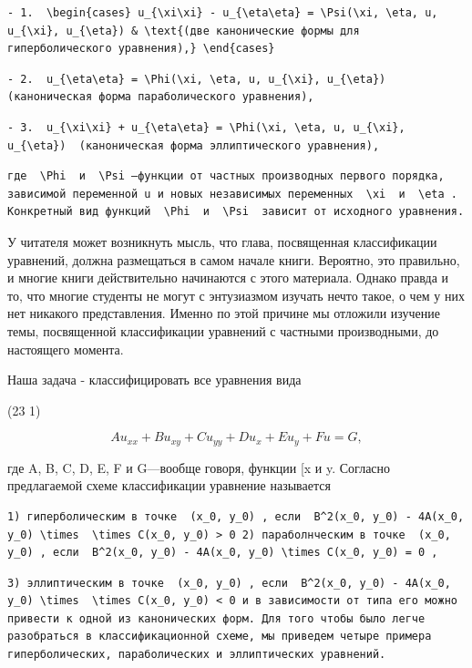\documentclass[
  ukrainian,
]{article}
\begin{document}
\begin{verbatim}
- 1.  \begin{cases} u_{\xi\xi} - u_{\eta\eta} = \Psi(\xi, \eta, u, u_{\xi}, u_{\eta}) & \text{(две канонические формы для гиперболического уравнения),} \end{cases}
\end{verbatim}

\begin{verbatim}
- 2.  u_{\eta\eta} = \Phi(\xi, \eta, u, u_{\xi}, u_{\eta})  (каноническая форма параболического уравнения),
\end{verbatim}

\begin{verbatim}
- 3.  u_{\xi\xi} + u_{\eta\eta} = \Phi(\xi, \eta, u, u_{\xi}, u_{\eta})  (каноническая форма эллиптического уравнения),
\end{verbatim}

\begin{verbatim}
где  \Phi  и  \Psi —функции от частных производных первого порядка, зависимой переменной u и новых независимых переменных  \xi  и  \eta . Конкретный вид функций  \Phi  и  \Psi  зависит от исходного уравнения.
\end{verbatim}

У читателя может возникнуть мысль, что глава, посвященная классификации
уравнений, должна размещаться в самом начале книги. Вероятно, это
правильно, и многие книги действительно начинаются с этого материала.
Однако правда и то, что многие студенты не могут с энтузиазмом изучать
нечто такое, о чем у них нет никакого представления. Именно по этой
причине мы отложили изучение темы, посвященной классификации уравнений с
частными производными, до настоящего момента.

Наша задача - классифицировать все уравнения вида

(23 1)

\[
Au_{xx} + Bu_{xy} + Cu_{yy} + Du_x + Eu_y + Fu = G,
\]

где A, B, C, D, E, F и G---вообще говоря, функции {[}x и y. Согласно
предлагаемой схеме классификации уравнение называется

\begin{verbatim}
1) гиперболическим в точке  (x_0, y_0) , если  B^2(x_0, y_0) - 4A(x_0, y_0) \times  \times C(x_0, y_0) > 0 2) параболнческим в точке  (x_0, y_0) , если  B^2(x_0, y_0) - 4A(x_0, y_0) \times C(x_0, y_0) = 0 ,
\end{verbatim}

\begin{verbatim}
3) эллиптическим в точке  (x_0, y_0) , если  B^2(x_0, y_0) - 4A(x_0, y_0) \times  \times C(x_0, y_0) < 0 и в зависимости от типа его можно привести к одной из канонических форм. Для того чтобы было легче разобраться в классификационной схеме, мы приведем четыре примера гиперболических, параболических и эллиптических уравнений.
\end{verbatim}
\end{document}
